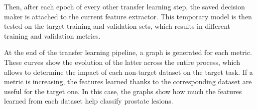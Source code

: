 Then, after each epoch of every other transfer learning step, the saved decision maker is attached to the current feature extractor. This temporary model is then tested on the target training and validation sets, which results in different training and validation metrics.

At the end of the transfer learning pipeline, a graph is generated for each metric. These curves show the evolution of the latter across the entire process, which allows to determine the impact of each non-target dataset on the target task. If a metric is increasing, the features learned thanks to the corresponding dataset are useful for the target one. In this case, the graphs show how much the features learned from each dataset help classify prostate lesions. 

%
%
%


